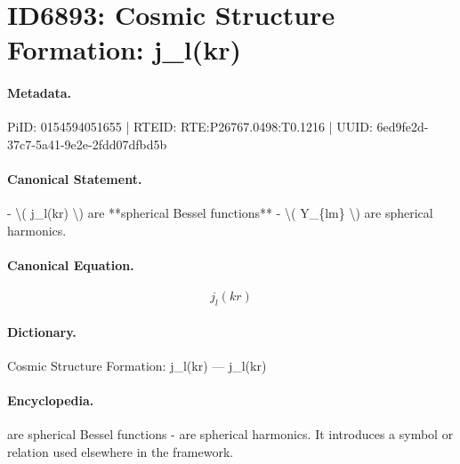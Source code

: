 \section*{ID6893: Cosmic Structure Formation: j\_l(kr)}
\paragraph{Metadata.}
PiID: 0154594051655 | RTEID: RTE:P26767.0498:T0.1216 | UUID: 6ed9fe2d-37c7-5a41-9e2e-2fdd07dfbd5b

\paragraph{Canonical Statement.}
- \textbackslash{}( j\_l(kr) \textbackslash{}) are **spherical Bessel functions** - \textbackslash{}( Y\_\{lm\} \textbackslash{}) are spherical harmonics.

\paragraph{Canonical Equation.}
\[
j_l(kr)
\]

\paragraph{Dictionary.}
Cosmic Structure Formation: j\_l(kr) — j\_l(kr)

\paragraph{Encyclopedia.}
are spherical Bessel functions - are spherical harmonics. It introduces a symbol or relation used elsewhere in the framework.
